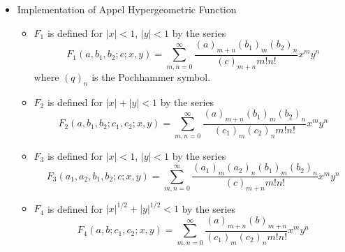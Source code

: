\documentclass{article}
\theoremstyle{mytheoremstyle}
\theoremstyle{mytheoremstyle}
\theoremstyle{myproblemstyle}
\begin{document}
\begin{itemize}
        \item Implementation of Appel Hypergeometric Function \cite{appell} 
          \begin{itemize}
            \item $F_1 $ is defined for $\lvert x  \rvert <1 $, $\lvert y  \rvert < 1 $ by the series \[
              F_1(a,b_1,b_2;c;x,y)=\displaystyle\sum_{m,n=0 }^{\infty } \displaystyle\frac{(a)_{m+n }(b_1)_{m }(b_2)_{n }}{(c)_{m+n}m!n! }x ^m y^n 
            \] 
              where $(q)_n $ is the Pochhammer symbol.
            \item $F_2 $ is defined for $\lvert x  \rvert +\lvert y  \rvert < 1 $ by the series \[
              F_2(a,b_1,b_2;c_1,c_2;x,y)=\displaystyle\sum_{m,n=0 }^{\infty } \displaystyle\frac{(a)_{m+n }(b_1)_{m }(b_2)_{n }}{(c_1)_{m}(c_2)_{n}m!n! }x ^m y^n 
            \] 
            \item $F_3 $ is defined for $\lvert x  \rvert <1 $, $\lvert y  \rvert < 1 $ by the series \[
              F_3(a_1,a_2,b_1,b_2;c;x,y)=\displaystyle\sum_{m,n=0 }^{\infty } \displaystyle\frac{(a_1)_{m}(a_2)_{n}(b_1)_{m }(b_2)_{n }}{(c)_{m+n}m!n! }x ^m y^n 
            \] 
            \item $F_4 $ is defined for $\lvert x  \rvert ^{1/2} +\lvert y  \rvert ^{1/2}< 1 $ by the series \[
              F_4(a,b;c_1,c_2;x,y)=\displaystyle\sum_{m,n=0 }^{\infty } \displaystyle\frac{(a)_{m+n }(b)_{m+n }}{(c_1)_{m}(c_2)_{n}m!n! }x ^m y^n 
            \] 
          \end{itemize}
      \end{itemize}
\end{document}
